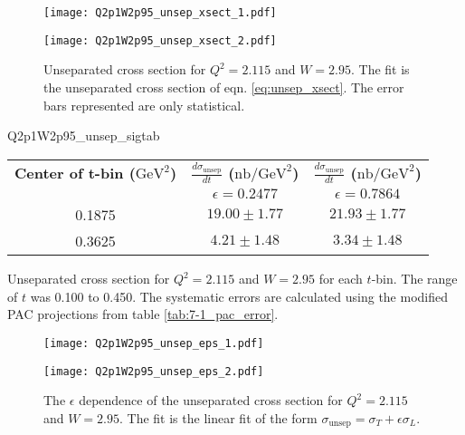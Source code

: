 \begin{figure}
  \centering
  \begin{minipage}[b]{0.48\linewidth}
    \texttt{[image: Q2p1W2p95\_unsep\_xsect\_1.pdf]}
  \end{minipage}
  \hfill
  \begin{minipage}[b]{0.48\linewidth}
    \texttt{[image: Q2p1W2p95\_unsep\_xsect\_2.pdf]}
  \end{minipage}  
  \caption{Unseparated cross section for $Q^2=2.115$ and $W=2.95$. The fit is the unseparated cross section of eqn. \ref{eq:unsep_xsect}. The error bars represented are only statistical.}
  \label{fig:Q2p1W2p95_unsep_xsect}
\end{figure}

\begin{Mtable}{Q2p1W2p95_unsep_sigtab}
  \centering
  \begin{tabular}{|c|c|c|}
    \hline
    \textbf{Center of t-bin ($\mathrm{GeV}^2$)} & \textbf{$\frac{d\sigma_{\mathrm{unsep}}}{dt}$ ($\mathrm{nb/GeV}^2$)} & \textbf{$\frac{d\sigma_{\mathrm{unsep}}}{dt}$ ($\mathrm{nb/GeV}^2$)} \\
    & $\epsilon=0.2477$ & $\epsilon=0.7864$ \\
    \hline
    0.1875 & $19.00\pm1.77$ & $21.93\pm1.77$\\
    0.3625 & $4.21\pm1.48$ & $3.34\pm1.48$\\
    \hline
  \end{tabular}
  \caption{Unseparated cross section for $Q^2=2.115$ and $W=2.95$ for each $t$-bin. The range of $t$ was 0.100 to 0.450. The systematic errors are calculated using the modified PAC projections from table \ref{tab:7-1_pac_error}.}
  \label{tab:Q2p1W2p95_unsep_sigtab}
\end{Mtable}

\begin{figure}
  \centering
  \begin{minipage}[b]{0.48\linewidth}
    \texttt{[image: Q2p1W2p95\_unsep\_eps\_1.pdf]}
  \end{minipage}
  \hfill
  \begin{minipage}[b]{0.48\linewidth}
    \texttt{[image: Q2p1W2p95\_unsep\_eps\_2.pdf]}
  \end{minipage}
  \caption{The $\epsilon$ dependence of the unseparated cross section for $Q^2=2.115$ and $W=2.95$. The fit is the linear fit of the form $\sigma_{\mathrm{unsep}}=\sigma_T+\epsilon\sigma_L$.}
  \label{fig:Q2p1W2p95_unsep_eps}
\end{figure}

